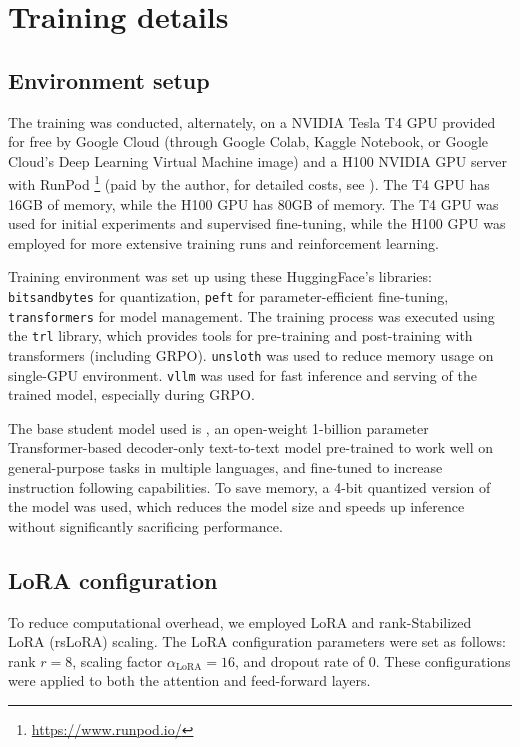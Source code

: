 \section{Training details} \label{app:training-details}

\subsection{Environment setup}
The training was conducted, alternately, on a NVIDIA Tesla T4 GPU provided for free by Google Cloud (through Google Colab, Kaggle Notebook, or Google Cloud's Deep Learning Virtual Machine image) and a H100 NVIDIA GPU server with RunPod \footnote{\url{https://www.runpod.io/}} (paid by the author, for detailed costs, see ). The T4 GPU has 16GB of memory, while the H100 GPU has 80GB of memory. The T4 GPU was used for initial experiments and supervised fine-tuning, while the H100 GPU was employed for  more extensive training runs and reinforcement learning.

Training environment was set up using these HuggingFace's libraries: \verb|bitsandbytes| for quantization, \verb|peft| for parameter-efficient fine-tuning, \verb|transformers| for model management. The training process was executed using the \verb|trl| library, which provides tools for pre-training and post-training with transformers (including GRPO). \verb|unsloth| was used to reduce memory usage on single-GPU environment. \verb|vllm| was used for fast inference and serving of the trained model, especially during GRPO.

The base student model used is \studentmodel, an open-weight 1-billion parameter Transformer-based decoder-only text-to-text model pre-trained to work well on general-purpose tasks in multiple languages, and fine-tuned to increase instruction following capabilities. To save memory, a 4-bit quantized version of the model was used, which reduces the model size and speeds up inference without significantly sacrificing performance.

\subsection{LoRA configuration} \label{app:lora-config}

To reduce computational overhead, we employed LoRA \citep{huLoRALowRankAdaptation2021} and rank-Stabilized LoRA (rsLoRA) scaling. The LoRA configuration parameters were set as follows: rank \( r = 8 \), scaling factor \( \alpha_{\text{LoRA}} = 16 \), and dropout rate of 0. These configurations were applied to both the attention and feed-forward layers.


